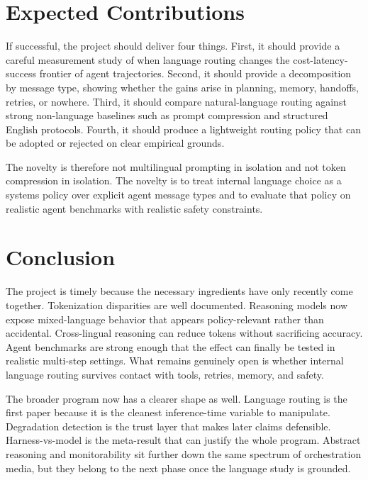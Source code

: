 \documentclass[11pt]{article}
\begin{document}
\section{Expected Contributions}

If successful, the project should deliver four things. First, it should provide a careful measurement study of when language routing changes the cost-latency-success frontier of agent trajectories. Second, it should provide a decomposition by message type, showing whether the gains arise in planning, memory, handoffs, retries, or nowhere. Third, it should compare natural-language routing against strong non-language baselines such as prompt compression and structured English protocols. Fourth, it should produce a lightweight routing policy that can be adopted or rejected on clear empirical grounds.

The novelty is therefore not multilingual prompting in isolation and not token compression in isolation. The novelty is to treat internal language choice as a systems policy over explicit agent message types and to evaluate that policy on realistic agent benchmarks with realistic safety constraints.

\section{Conclusion}

The project is timely because the necessary ingredients have only recently come together. Tokenization disparities are well documented. Reasoning models now expose mixed-language behavior that appears policy-relevant rather than accidental. Cross-lingual reasoning can reduce tokens without sacrificing accuracy. Agent benchmarks are strong enough that the effect can finally be tested in realistic multi-step settings. What remains genuinely open is whether internal language routing survives contact with tools, retries, memory, and safety.

The broader program now has a clearer shape as well. Language routing is the first paper because it is the cleanest inference-time variable to manipulate. Degradation detection is the trust layer that makes later claims defensible. Harness-vs-model is the meta-result that can justify the whole program. Abstract reasoning and monitorability sit further down the same spectrum of orchestration media, but they belong to the next phase once the language study is grounded.
\end{document}
